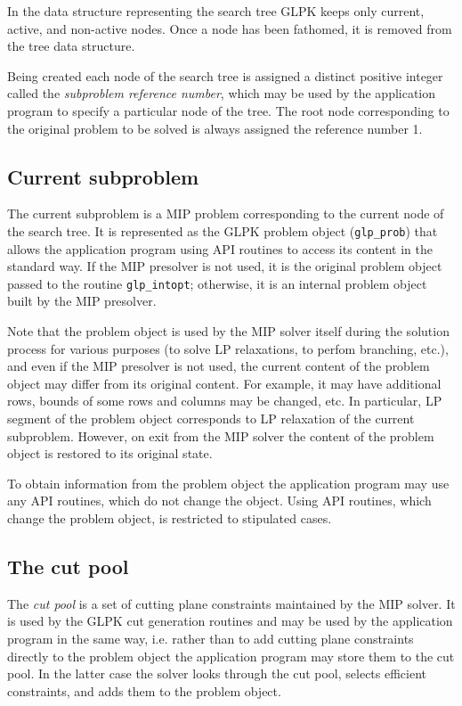 In the data structure representing the search tree GLPK keeps only
current, active, and non-active nodes. Once a node has been fathomed,
it is removed from the tree data structure.

Being created each node of the search tree is assigned a distinct
positive integer called the {\it subproblem reference number}, which
may be used by the application program to specify a particular node of
the tree. The root node corresponding to the original problem to be
solved is always assigned the reference number 1.

\subsection{Current subproblem}

The current subproblem is a MIP problem corresponding to the current
node of the search tree. It is represented as the GLPK problem object
(\verb|glp_prob|) that allows the application program using API routines
to access its content in the standard way. If the MIP presolver is not
used, it is the original problem object passed to the routine
\verb|glp_intopt|; otherwise, it is an internal problem object built by
the MIP presolver.

Note that the problem object is used by the MIP solver itself during
the solution process for various purposes (to solve LP relaxations, to
perfom branching, etc.), and even if the MIP presolver is not used, the
current content of the problem object may differ from its original
content. For example, it may have additional rows, bounds of some rows
and columns may be changed, etc. In particular, LP segment of the
problem object corresponds to LP relaxation of the current subproblem.
However, on exit from the MIP solver the content of the problem object
is restored to its original state.

To obtain information from the problem object the application program
may use any API routines, which do not change the object. Using API
routines, which change the problem object, is restricted to stipulated
cases.

\subsection{The cut pool}

The {\it cut pool} is a set of cutting plane constraints maintained by
the MIP solver. It is used by the GLPK cut generation routines and may
be used by the application program in the same way, i.e. rather than
to add cutting plane constraints directly to the problem object the
application program may store them to the cut pool. In the latter case
the solver looks through the cut pool, selects efficient constraints,
and adds them to the problem object.

